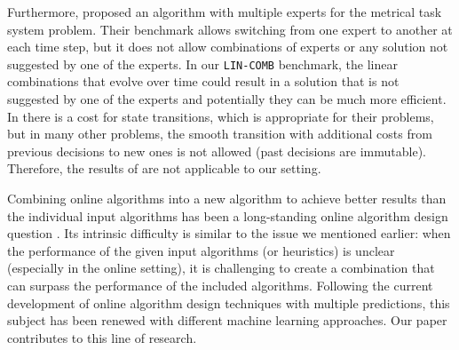 Furthermore, \cite{AntoniosEtAll23:mixing-predictions-metric-algorithms} proposed an algorithm with multiple experts for the metrical task system problem. Their benchmark allows switching from one expert to another at each time step, but it does not allow combinations of experts or any solution not suggested by one of the experts. In our \texttt{LIN-COMB} benchmark, the linear combinations that evolve over time could result in a solution that is not suggested by one of the experts and potentially they can be much more efficient. In \cite{AntoniosEtAll23:mixing-predictions-metric-algorithms} there is a cost for state transitions, which is appropriate for their problems, but in many other problems, the smooth transition with additional costs from previous decisions to new ones is not allowed (past decisions are immutable). Therefore, the results of \cite{AntoniosEtAll23:mixing-predictions-metric-algorithms} are not applicable to our setting.

Combining online algorithms into a new algorithm to achieve better results than the individual input algorithms has been a long-standing online algorithm design question \cite{AzarBroder93:On-line-Choice,BlumBurch00:On-line-Learning}.
Its intrinsic difficulty is similar to the issue we mentioned earlier: when the performance of the given input algorithms (or heuristics) is unclear (especially in the online setting), it is challenging to create a combination that can surpass the performance of the included algorithms.
Following the current development of online algorithm design techniques with multiple predictions, this subject has been renewed with different machine learning approaches. Our paper contributes to this line of research.
